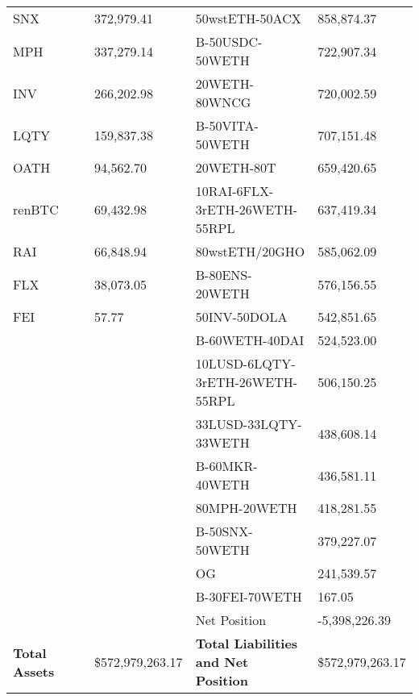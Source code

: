 \begin{longtable}{@{}p{0.25\linewidth}p{0.25\linewidth}p{0.25\linewidth}p{0.25\linewidth}@{}}
SNX & 372,979.41 & 50wstETH-50ACX & 858,874.37 \\
MPH & 337,279.14 & B-50USDC-50WETH & 722,907.34 \\
INV & 266,202.98 & 20WETH-80WNCG & 720,002.59 \\
LQTY & 159,837.38 & B-50VITA-50WETH & 707,151.48 \\
OATH & 94,562.70 & 20WETH-80T & 659,420.65 \\
renBTC & 69,432.98 & 10RAI-6FLX-3rETH-26WETH-55RPL & 637,419.34 \\
RAI & 66,848.94 & 80wstETH/20GHO & 585,062.09 \\
FLX & 38,073.05 & B-80ENS-20WETH & 576,156.55 \\
FEI & 57.77 & 50INV-50DOLA & 542,851.65 \\
 &  & B-60WETH-40DAI & 524,523.00 \\
 &  & 10LUSD-6LQTY-3rETH-26WETH-55RPL & 506,150.25 \\
 &  & 33LUSD-33LQTY-33WETH & 438,608.14 \\
 &  & B-60MKR-40WETH & 436,581.11 \\
 &  & 80MPH-20WETH & 418,281.55 \\
 &  & B-50SNX-50WETH & 379,227.07 \\
 &  & OG & 241,539.57 \\
 &  & B-30FEI-70WETH & 167.05 \\
 &  & Net Position & -5,398,226.39 \\

\midrule

\textbf{Total Assets} & \$572,979,263.17 & \textbf{Total Liabilities and Net Position} & \$572,979,263.17 \\

\bottomrule

\end{longtable}
